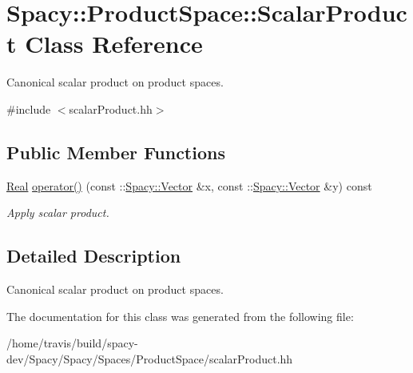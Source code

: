 \hypertarget{classSpacy_1_1ProductSpace_1_1ScalarProduct}{\section{Spacy\-:\-:Product\-Space\-:\-:Scalar\-Product Class Reference}
\label{classSpacy_1_1ProductSpace_1_1ScalarProduct}
}


Canonical scalar product on product spaces.  




{\ttfamily \#include $<$scalar\-Product.\-hh$>$}

\subsection*{Public Member Functions}
\begin{DoxyCompactItemize}
\item 
\hypertarget{classSpacy_1_1ProductSpace_1_1ScalarProduct_a71a7e705455d1005c7611a259346c0c2}{\hyperlink{classSpacy_1_1Real}{Real} \hyperlink{classSpacy_1_1ProductSpace_1_1ScalarProduct_a71a7e705455d1005c7611a259346c0c2}{operator()} (const \-::\hyperlink{classSpacy_1_1Vector}{Spacy\-::\-Vector} \&x, const \-::\hyperlink{classSpacy_1_1Vector}{Spacy\-::\-Vector} \&y) const }\label{classSpacy_1_1ProductSpace_1_1ScalarProduct_a71a7e705455d1005c7611a259346c0c2}

\begin{DoxyCompactList}\small\item\em Apply scalar product. \end{DoxyCompactList}\end{DoxyCompactItemize}


\subsection{Detailed Description}
Canonical scalar product on product spaces. 

The documentation for this class was generated from the following file\-:\begin{DoxyCompactItemize}
\item 
/home/travis/build/spacy-\/dev/\-Spacy/\-Spacy/\-Spaces/\-Product\-Space/scalar\-Product.\-hh\end{DoxyCompactItemize}
